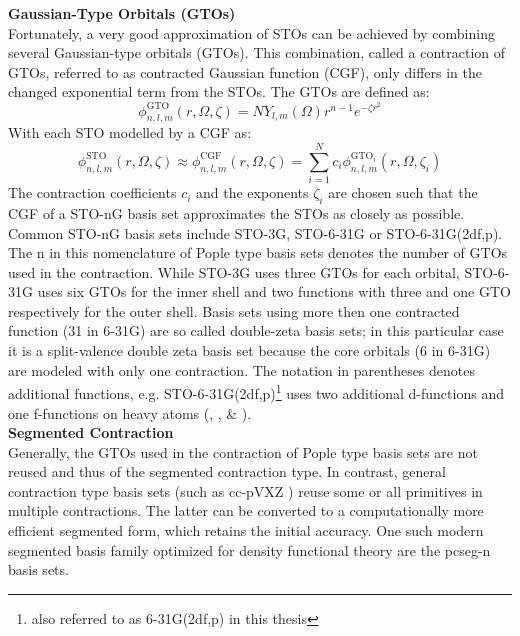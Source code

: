 \textbf{Gaussian-Type Orbitals (GTOs)}\\
Fortunately, a very good approximation of STOs can be achieved by combining several Gaussian-type orbitals (GTOs). This combination, called a contraction of GTOs, referred to as contracted Gaussian function (CGF), only differs in the changed exponential term from the STOs. The GTOs are defined as:
\begin{equation}
    \label{eq:gaussian_orbital}
    \phi_{n, l, m}^{\text{GTO}}(r, \Omega, \zeta) = N Y_{l,m}(\Omega) r^{n-1} e^{-\zeta r^2}
\end{equation}
With each STO modelled by a CGF as: 
\begin{equation}
    \phi_{n, l, m}^{\text{STO}}(r, \Omega, \zeta)  \approx \phi_{n, l, m}^{\text{CGF}}(r, \Omega, \zeta) = \sum_{i=1}^N c_i \phi_{n, l, m}^{\text{GTO}_i}(r, \Omega, \zeta_i)
\end{equation}
The contraction coefficients $c_i$ and the exponents $\zeta_i$ are chosen such that the CGF of a STO-nG basis set approximates the STOs as closely as possible. Common STO-nG basis sets include STO-3G, STO-6-31G or STO-6-31G(2df,p). \\
The n in this nomenclature of Pople type basis sets \parencite{ref:pople_basis} denotes the number of GTOs used in the contraction. While STO-3G uses three GTOs for each orbital, STO-6-31G uses six GTOs for the inner shell and two functions with three and one GTO respectively for the outer shell. Basis sets using more then one contracted function (31 in 6-31G) are so called double-zeta basis sets; in this particular case it is a split-valence double zeta basis set because the core orbitals (6 in 6-31G) are modeled with only one contraction. The notation in parentheses denotes additional functions, e.g. STO-6-31G(2df,p)\footnote{also referred to as 6-31G(2df,p) in this thesis} uses two additional d-functions and one f-functions on heavy atoms (, ,  \& ). \\

\textbf{Segmented Contraction}\\
Generally, the GTOs used in the contraction of Pople type basis sets are not reused and thus of the segmented contraction type. In contrast, general contraction type basis sets (such as cc-pVXZ \parencite{ref:cc-pVXZ}) reuse some or all primitives in multiple contractions. The latter can be converted to a computationally more efficient segmented form, which retains the initial accuracy. One such modern segmented basis family optimized for density functional theory are the pcseg-n basis sets. \parencite{ref:Jensen2014pcs}\\

